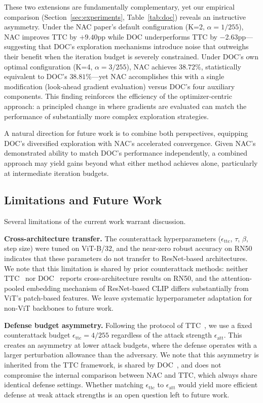 \documentclass[12pt,a4paper]{article}
\begin{document}
These two extensions are fundamentally complementary, yet our empirical comparison (Section~\ref{sec:experiments}, Table~\ref{tab:doc}) reveals an instructive asymmetry. Under the NAC paper's default configuration (K=2, $\alpha=1/255$), NAC improves TTC by $+9.40$pp while DOC underperforms TTC by $-$2.63pp---suggesting that DOC's exploration mechanisms introduce noise that outweighs their benefit when the iteration budget is severely constrained. Under DOC's own optimal configuration (K=4, $\alpha=3/255$), NAC achieves $38.72\%$, statistically equivalent to DOC's $38.81\%$---yet NAC accomplishes this with a single modification (look-ahead gradient evaluation) versus DOC's four auxiliary components. This finding reinforces the efficiency of the optimizer-centric approach: a principled change in where gradients are evaluated can match the performance of substantially more complex exploration strategies.

A natural direction for future work is to combine both perspectives, equipping DOC's diversified exploration with NAC's accelerated convergence. Given NAC's demonstrated ability to match DOC's performance independently, a combined approach may yield gains beyond what either method achieves alone, particularly at intermediate iteration budgets.

\subsection{Limitations and Future Work}

Several limitations of the current work warrant discussion.

\textbf{Cross-architecture transfer.} The counterattack hyperparameters ($\epsilon_{\text{ttc}}$, $\tau$, $\beta$, step size) were tuned on ViT-B/32, and the near-zero robust accuracy on RN50 indicates that these parameters do not transfer to ResNet-based architectures. We note that this limitation is shared by prior counterattack methods: neither TTC~\cite{xing2025clip} nor DOC~\cite{jiang2026diversifying} reports cross-architecture results on RN50, and the attention-pooled embedding mechanism of ResNet-based CLIP differs substantially from ViT's patch-based features. We leave systematic hyperparameter adaptation for non-ViT backbones to future work.

\textbf{Defense budget asymmetry.} Following the protocol of TTC~\cite{xing2025clip}, we use a fixed counterattack budget $\epsilon_{\text{ttc}}=4/255$ regardless of the attack strength $\epsilon_{\text{att}}$. This creates an asymmetry at lower attack budgets, where the defense operates with a larger perturbation allowance than the adversary. We note that this asymmetry is inherited from the TTC framework, is shared by DOC~\cite{jiang2026diversifying}, and does not compromise the internal comparison between NAC and TTC, which always share identical defense settings. Whether matching $\epsilon_{\text{ttc}}$ to $\epsilon_{\text{att}}$ would yield more efficient defense at weak attack strengths is an open question left to future work.
\end{document}
